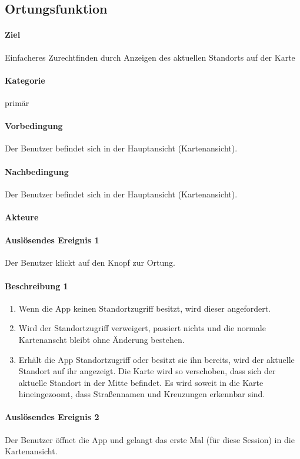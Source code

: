 \subsection{Ortungsfunktion}
\label{Ortungsfunktion}
\paragraph{Ziel}
Einfacheres Zurechtfinden durch Anzeigen des aktuellen Standorts auf der Karte
\paragraph{Kategorie}
primär
\paragraph{Vorbedingung}
Der Benutzer befindet sich in der Hauptansicht (Kartenansicht).
\paragraph{Nachbedingung}
Der Benutzer befindet sich in der Hauptansicht (Kartenansicht).
\paragraph{Akteure}

\paragraph{Auslösendes Ereignis 1}
Der Benutzer klickt auf den Knopf zur Ortung.
\paragraph{Beschreibung 1}
\begin{enumerate}
    \item Wenn die App keinen Standortzugriff besitzt, wird dieser angefordert.
    \item Wird der Standortzugriff verweigert, passiert nichts und die normale Kartenanscht bleibt ohne Änderung bestehen.
    \item Erhält die App Standortzugriff oder besitzt sie ihn bereits, wird der aktuelle Standort auf ihr angezeigt. Die Karte wird so verschoben, dass sich der aktuelle Standort in der Mitte befindet. Es wird soweit in die Karte hineingezoomt, dass Straßennamen und Kreuzungen erkennbar sind.
\end{enumerate}

\paragraph{Auslösendes Ereignis 2}
Der Benutzer öffnet die App und gelangt das erste Mal (für diese Session) in die Kartenansicht.
